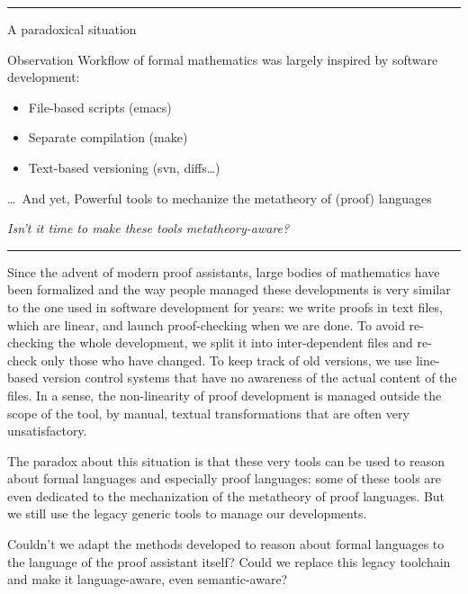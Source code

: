 \documentclass[ignorenonframetext,red]{beamer}
\begin{document}
\hrule
\begin{frame}{A paradoxical situation}  
  \begin{block}{Observation}
    Workflow of formal mathematics was largely inspired by software
    development:
    \begin{itemize}
    \item File-based scripts (\textsf{emacs})
    \item Separate compilation (\textsf{make})
    \item Text-based versioning (\textsf{svn}, \textsf{diff}s\ldots)
    \end{itemize}
  \end{block}
  \pause
  \begin{block}{\ldots\ And yet,}
    Powerful tools to mechanize the metatheory of (proof) languages
  \end{block}
  \vspace{0.6em}
  \pause
  \begin{center}
    {\large \it Isn't it time to make these tools metatheory-aware?}
  \end{center}
\end{frame}
\hrule

Since the advent of modern proof assistants, large bodies of
mathematics have been formalized and the way people managed these
developments is very similar to the one used in software development
for years: we write proofs in text files, which are linear, and launch
proof-checking when we are done. To avoid re-checking the whole
development, we split it into inter-dependent files and re-check only
those who have changed. To keep track of old versions, we use
line-based version control systems that have no awareness of the
actual content of the files. In a sense, the non-linearity of proof
development is managed outside the scope of the tool, by manual,
textual transformations that are often very unsatisfactory.

The paradox about this situation is that these very tools can be used
to reason about formal languages and especially proof languages: some
of these tools are even dedicated to the mechanization of the
metatheory of proof languages. But we still use the legacy generic
tools to manage our developments.

Couldn't we adapt the methods developed to reason about formal
languages to the language of the proof assistant itself? Could we
replace this legacy toolchain and make it language-aware, even
semantic-aware?
\end{document}
